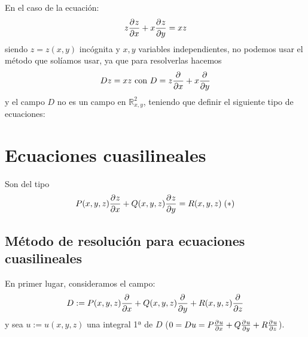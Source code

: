 \begin{eje}
        En el caso de la ecuación:
        $$z \frac{\partial^{} z}{\partial x}+x\frac{\partial^{} z}{\partial y}=xz$$ 
        siendo $z=z(x,y)$ incógnita y $x,y$ variables independientes, no podemos usar el método que solíamos usar, ya que para resolverlas hacemos
        $$Dz=xz \text{ con } D=z\frac{\partial^{} }{\partial x} + x \frac{\partial^{} }{\partial y}$$
        y el campo $D$ no es un campo en $\mathbb R^2_{x,y}$, teniendo que definir el siguiente tipo de ecuaciones:
    \end{eje}
\section{Ecuaciones cuasilineales}

Son del tipo
    $$P(x,y,z) \frac{\partial^{} z}{\partial x}+Q(x,y,z) \frac{\partial^{} z}{\partial y}=R(x,y,z) \; (*)$$
    \subsection{Método de resolución para ecuaciones cuasilineales}

    En primer lugar, consideramos el campo:
    $$D:=P(x,y,z) \frac{\partial^{} }{\partial x}+Q(x,y,z) \frac{\partial^{} }{\partial y}+R(x,y,z) \frac{\partial^{} }{\partial z}$$
    y sea $u:=u(x,y,z)$ una integral 1ª de $D$ ($0=Du=P\frac{\partial^{} u}{\partial x}+Q\frac{\partial^{} u}{\partial y}+R\frac{\partial^{} u}{\partial z}$). 

